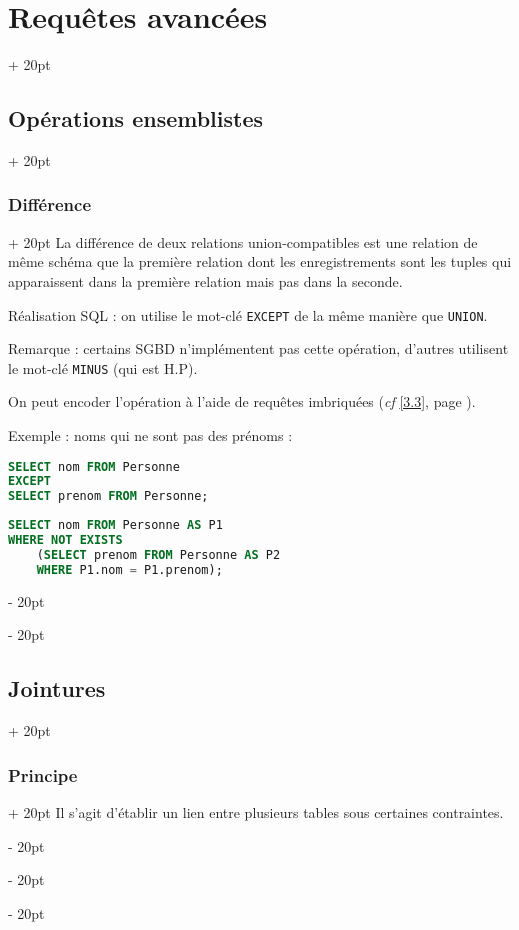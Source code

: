 \documentclass[a4paper, 12pt, twoside]{article}
\newcommand{\ind}[1][20pt]{\advance\leftskip + #1}
\newcommand{\deind}[1][20pt]{\advance\leftskip - #1}
\newenvironment{indt}[2][20pt]{#2 \par \ind[#1]}{\par \deind} %
\begin{document}
\begin{indt}{\section{Requêtes avancées}}
\begin{indt}{\subsection{Opérations ensemblistes}}
            \vspace{12pt}
            
            \begin{indt}{\subsubsection{Différence}}
                La différence de deux relations union-compatibles est une relation de même schéma que la première relation dont les enregistrements sont les tuples qui apparaissent dans la première relation mais pas dans la seconde.

                Réalisation SQL : on utilise le mot-clé \texttt{EXCEPT} de la même manière que \texttt{UNION}.

                Remarque : certains SGBD n'implémentent pas cette opération, d'autres utilisent le mot-clé \texttt{MINUS} (qui est H.P).

                On peut encoder l'opération à l'aide de requêtes imbriquées (\textit{cf} \ref{3.3}, page \pageref{3.3}).

                \vspace{6pt}
                
                Exemple : noms qui ne sont pas des prénoms :

                \begin{lstlisting}[language=SQL, xleftmargin=80pt]
SELECT nom FROM Personne
EXCEPT
SELECT prenom FROM Personne;\end{lstlisting}

                \begin{lstlisting}[language=SQL, xleftmargin=80pt]
SELECT nom FROM Personne AS P1
WHERE NOT EXISTS
    (SELECT prenom FROM Personne AS P2
    WHERE P1.nom = P1.prenom);\end{lstlisting}
            \end{indt}
        \end{indt}

        \vspace{12pt}
        
        \begin{indt}{\subsection{Jointures}}
            \label{3.2}

            \begin{indt}{\subsubsection{Principe}}
                Il s'agit d'établir un lien entre plusieurs tables sous certaines contraintes.


\end{indt}
\end{indt}
\end{indt}
\end{document}
